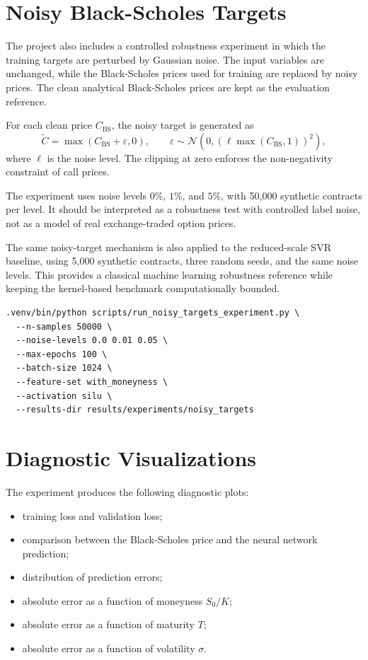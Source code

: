 \section{Noisy Black-Scholes Targets}

The project also includes a controlled robustness experiment in which the
training targets are perturbed by Gaussian noise.
The input variables are unchanged, while the Black-Scholes prices used for
training are replaced by noisy prices.
The clean analytical Black-Scholes prices are kept as the evaluation reference.

For each clean price $C_{\mathrm{BS}}$, the noisy target is generated as
\[
    \widetilde{C}
    =
    \max\left(
        C_{\mathrm{BS}} + \varepsilon,
        0
    \right),
    \qquad
    \varepsilon \sim
    \mathcal{N}\left(
        0,
        \left(\ell \max(C_{\mathrm{BS}}, 1)\right)^2
    \right),
\]
where $\ell$ is the noise level.
The clipping at zero enforces the non-negativity constraint of call prices.

The experiment uses noise levels $0\%$, $1\%$, and $5\%$, with 50,000 synthetic
contracts per level.
It should be interpreted as a robustness test with controlled label noise, not
as a model of real exchange-traded option prices.

The same noisy-target mechanism is also applied to the reduced-scale SVR
baseline, using 5,000 synthetic contracts, three random seeds, and the same
noise levels.
This provides a classical machine learning robustness reference while keeping
the kernel-based benchmark computationally bounded.

\begin{lstlisting}[style=pythonstyle, caption={Command used for the noisy-target experiment.}]
.venv/bin/python scripts/run_noisy_targets_experiment.py \
  --n-samples 50000 \
  --noise-levels 0.0 0.01 0.05 \
  --max-epochs 100 \
  --batch-size 1024 \
  --feature-set with_moneyness \
  --activation silu \
  --results-dir results/experiments/noisy_targets
\end{lstlisting}

\section{Diagnostic Visualizations}

The experiment produces the following diagnostic plots:

\begin{itemize}
    \item training loss and validation loss;
    \item comparison between the Black-Scholes price and the neural network prediction;
    \item distribution of prediction errors;
    \item absolute error as a function of moneyness $S_0/K$;
    \item absolute error as a function of maturity $T$;
    \item absolute error as a function of volatility $\sigma$.
\end{itemize}
